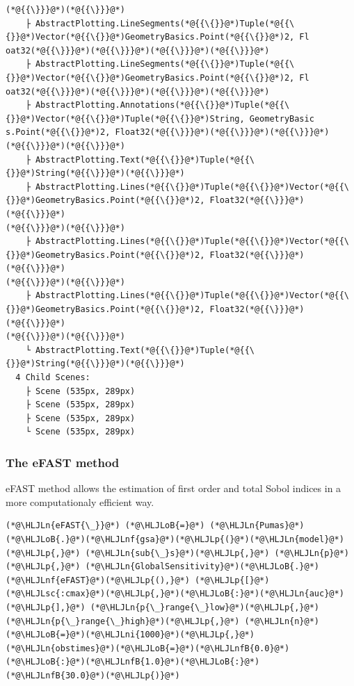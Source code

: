 \documentclass[12pt,a4paper]{article}
\newcommand{\HLJLn}[1]{#1}
\newcommand{\HLJLnf}[1]{\textcolor[RGB]{66,102,213}{#1}}
\newcommand{\HLJLsc}[1]{\textcolor[RGB]{201,61,57}{#1}}
\newcommand{\HLJLnfB}[1]{\textcolor[RGB]{59,151,46}{#1}}
\newcommand{\HLJLni}[1]{\textcolor[RGB]{59,151,46}{#1}}
\newcommand{\HLJLoB}[1]{\textcolor[RGB]{102,102,102}{\textbf{#1}}}
\newcommand{\HLJLp}[1]{#1}
\begin{document}
\begin{lstlisting}
(*@{{\}}}@*)(*@{{\}}}@*)
    ├ AbstractPlotting.LineSegments(*@{{\{}}@*)Tuple(*@{{\{}}@*)Vector(*@{{\{}}@*)GeometryBasics.Point(*@{{\{}}@*)2, Fl
oat32(*@{{\}}}@*)(*@{{\}}}@*)(*@{{\}}}@*)(*@{{\}}}@*)
    ├ AbstractPlotting.LineSegments(*@{{\{}}@*)Tuple(*@{{\{}}@*)Vector(*@{{\{}}@*)GeometryBasics.Point(*@{{\{}}@*)2, Fl
oat32(*@{{\}}}@*)(*@{{\}}}@*)(*@{{\}}}@*)(*@{{\}}}@*)
    ├ AbstractPlotting.Annotations(*@{{\{}}@*)Tuple(*@{{\{}}@*)Vector(*@{{\{}}@*)Tuple(*@{{\{}}@*)String, GeometryBasic
s.Point(*@{{\{}}@*)2, Float32(*@{{\}}}@*)(*@{{\}}}@*)(*@{{\}}}@*)(*@{{\}}}@*)(*@{{\}}}@*)
    ├ AbstractPlotting.Text(*@{{\{}}@*)Tuple(*@{{\{}}@*)String(*@{{\}}}@*)(*@{{\}}}@*)
    ├ AbstractPlotting.Lines(*@{{\{}}@*)Tuple(*@{{\{}}@*)Vector(*@{{\{}}@*)GeometryBasics.Point(*@{{\{}}@*)2, Float32(*@{{\}}}@*)(*@{{\}}}@*)
(*@{{\}}}@*)(*@{{\}}}@*)
    ├ AbstractPlotting.Lines(*@{{\{}}@*)Tuple(*@{{\{}}@*)Vector(*@{{\{}}@*)GeometryBasics.Point(*@{{\{}}@*)2, Float32(*@{{\}}}@*)(*@{{\}}}@*)
(*@{{\}}}@*)(*@{{\}}}@*)
    ├ AbstractPlotting.Lines(*@{{\{}}@*)Tuple(*@{{\{}}@*)Vector(*@{{\{}}@*)GeometryBasics.Point(*@{{\{}}@*)2, Float32(*@{{\}}}@*)(*@{{\}}}@*)
(*@{{\}}}@*)(*@{{\}}}@*)
    └ AbstractPlotting.Text(*@{{\{}}@*)Tuple(*@{{\{}}@*)String(*@{{\}}}@*)(*@{{\}}}@*)
  4 Child Scenes:
    ├ Scene (535px, 289px)
    ├ Scene (535px, 289px)
    ├ Scene (535px, 289px)
    └ Scene (535px, 289px)
\end{lstlisting}


\subsubsection{The eFAST method}
eFAST method allows the estimation of first order and total Sobol indices in a more computationaly efficient way.


\begin{lstlisting}
(*@\HLJLn{eFAST{\_}}@*) (*@\HLJLoB{=}@*) (*@\HLJLn{Pumas}@*)(*@\HLJLoB{.}@*)(*@\HLJLnf{gsa}@*)(*@\HLJLp{(}@*)(*@\HLJLn{model}@*)(*@\HLJLp{,}@*) (*@\HLJLn{sub{\_}s}@*)(*@\HLJLp{,}@*) (*@\HLJLn{p}@*)(*@\HLJLp{,}@*) (*@\HLJLn{GlobalSensitivity}@*)(*@\HLJLoB{.}@*)(*@\HLJLnf{eFAST}@*)(*@\HLJLp{(),}@*) (*@\HLJLp{[}@*)(*@\HLJLsc{:cmax}@*)(*@\HLJLp{,}@*)(*@\HLJLoB{:}@*)(*@\HLJLn{auc}@*)(*@\HLJLp{],}@*) (*@\HLJLn{p{\_}range{\_}low}@*)(*@\HLJLp{,}@*) (*@\HLJLn{p{\_}range{\_}high}@*)(*@\HLJLp{,}@*) (*@\HLJLn{n}@*)(*@\HLJLoB{=}@*)(*@\HLJLni{1000}@*)(*@\HLJLp{,}@*) (*@\HLJLn{obstimes}@*)(*@\HLJLoB{=}@*)(*@\HLJLnfB{0.0}@*)(*@\HLJLoB{:}@*)(*@\HLJLnfB{1.0}@*)(*@\HLJLoB{:}@*)(*@\HLJLnfB{30.0}@*)(*@\HLJLp{)}@*)
\end{lstlisting}
\end{document}
